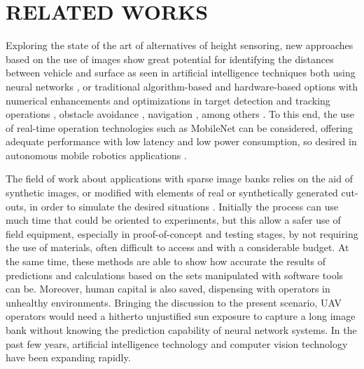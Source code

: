 \section{RELATED WORKS}
    Exploring the state of the art of alternatives of height sensoring, new approaches based on the use of images show great potential for identifying the distances between vehicle and surface as seen in artificial intelligence techniques both using neural networks \cite{MonocularDepth}, or traditional algorithm-based and hardware-based options with numerical enhancements and optimizations in target detection and tracking operations \cite{SurveyObjDetectionTracking}, obstacle avoidance \cite{CNNSingleImageQuadrotor} \cite{AircraftColAvoid}, navigation \cite{ByMySelf}, among others \cite{OpticalFlowStereo}.
    To this end, the use of real-time operation technologies such as MobileNet can be considered, offering adequate performance with low latency and low power consumption, so desired in autonomous mobile robotics applications \cite{MobileNetTracking}.
    
    The field of work about applications with sparse image banks relies on the aid of synthetic images, or modified with elements of real or synthetically generated cut-outs, in order to simulate the desired situations \cite{BlenderSmoke} \cite{BlurFiducial} \cite{ObjetoSintetico} \cite{TurbineBlur} \cite{BlenderMapa}.
    Initially the process can use much time that could be oriented to experiments, but this allow a safer use of field equipment, especially in proof-of-concept and testing stages, by not requiring the use of materials, often difficult to access and with a considerable budget. 
    At the same time, these methods are able to show how accurate the results of predictions and calculations based on the sets manipulated with software tools can be. 
    Moreover, human capital is also saved, dispensing with operators in unhealthy environments. 
    Bringing the discussion to the present scenario, UAV operators would need a hitherto unjustified sun exposure to capture a long image bank without knowing the prediction capability of neural network systems. 
    In the past few years, artificial intelligence technology and computer vision technology have been expanding rapidly.
    
